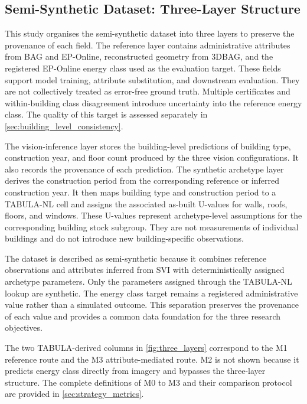 \subsection{Semi-Synthetic Dataset: Three-Layer Structure}
\label{sec:three_layer_structure}

This study organises the semi-synthetic dataset into three layers to preserve the provenance of each field.
The reference layer contains administrative attributes from BAG and EP-Online, reconstructed geometry from 3DBAG, and the registered EP-Online energy class used as the evaluation target.
These fields support model training, attribute substitution, and downstream evaluation.
They are not collectively treated as error-free ground truth.
Multiple certificates and within-building class disagreement introduce uncertainty into the reference energy class.
The quality of this target is assessed separately in \cref{sec:building_level_consistency}.

The vision-inference layer stores the building-level predictions of building type, construction year, and floor count produced by the three vision configurations.
It also records the provenance of each prediction.
The synthetic archetype layer derives the construction period from the corresponding reference or inferred construction year.
It then maps building type and construction period to a TABULA-NL cell and assigns the associated as-built U-values for walls, roofs, floors, and windows.
These U-values represent archetype-level assumptions for the corresponding building stock subgroup.
They are not measurements of individual buildings and do not introduce new building-specific observations.

The dataset is described as semi-synthetic because it combines reference observations and attributes inferred from \ac{SVI} with deterministically assigned archetype parameters.
Only the parameters assigned through the TABULA-NL lookup are synthetic.
The energy class target remains a registered administrative value rather than a simulated outcome.
This separation preserves the provenance of each value and provides a common data foundation for the three research objectives.

The two TABULA-derived columns in \cref{fig:three_layers} correspond to the M1 reference route and the M3 attribute-mediated route.
M2 is not shown because it predicts energy class directly from imagery and bypasses the three-layer structure.
The complete definitions of M0 to M3 and their comparison protocol are provided in \cref{sec:strategy_metrics}.

